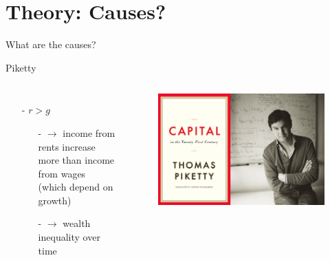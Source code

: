 \documentclass{beamer}
\begin{document}
\section{Theory: Causes?}

\begin{frame}{}
\centering
\alert{\Large{What are the causes?}}
\end{frame}

\begin{frame}{Piketty}
\begin{columns}
\begin{itemize}
    \item[-]$r>g$\pause
    \begin{itemize}
        \item[-]$\rightarrow$ income from rents increase more than income from wages (which depend on growth)\pause
        \item[-]$\rightarrow$ wealth inequality over time
    \end{itemize}{}
\end{itemize}{}
\begin{figure}
    \centering
    \includegraphics[width=\textwidth]{../img/PikettyCapital.jpg}
\end{figure}{}
\end{columns}
\end{frame}{}
\end{document}
